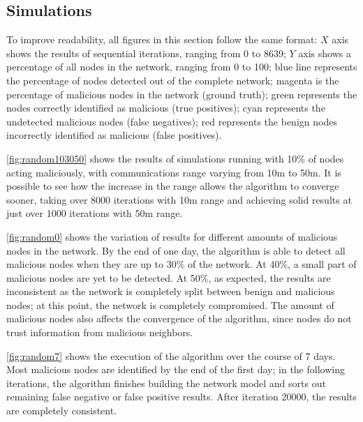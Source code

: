\documentclass[conference]{IEEEtran}
\begin{document}
\subsection{Simulations}
\label{subsection:simulations}
To improve readability, all figures in this section follow the same format:
$X$ axis shows the results of sequential iterations, ranging from 0 to 8639;
$Y$ axis shows a percentage of all nodes in the network, ranging from 0 to 100;
blue line represents the percentage of nodes detected out of the complete network;
magenta is the percentage of malicious nodes in the network (ground truth);
green represents the nodes correctly identified as malicious (true positives);
cyan represents the undetected malicious nodes (false negatives); 
red represents the benign nodes incorrectly identified as malicious (false positives).

\autoref{fig:random103050} shows the results of simulations running with 10\% of nodes acting maliciously, with communications range varying from 10m to 50m.
It is possible to see how the increase in the range allows the algorithm to converge sooner, taking over 8000 iterations with 10m range and achieving solid results at just over 1000 iterations with 50m range. 

\autoref{fig:random0} shows the variation of results for different amounts of malicious nodes in the network.
By the end of one day, the algorithm is able to detect all malicious nodes when they are up to 30\% of the network.
At 40\%, a small part of malicious nodes are yet to be detected.
At 50\%, as expected, the results are inconsistent as the network is completely split between benign and malicious nodes; at this point, the network is completely compromised.
The amount of malicious nodes also affects the convergence of the algorithm, since nodes do not trust information from malicious neighbors.

\autoref{fig:random7} shows the execution of the algorithm over the course of 7 days.
Most malicious nodes are identified by the end of the first day; in the following iterations, the algorithm finishes building the network model and sorts out remaining false negative or false positive results.
After iteration 20000, the results are completely consistent.


\end{document}
